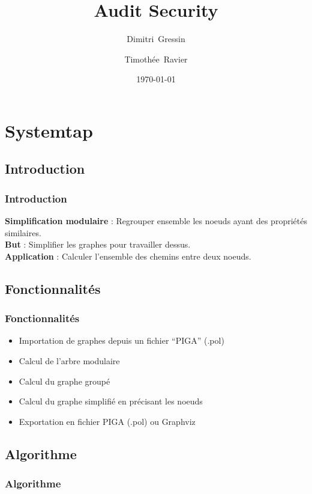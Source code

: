 \documentclass{beamer}
\title{Audit Security}
\author{Dimitri~Gressin \and Timothée~Ravier}
\institute{ENSI de Bourges}
\date{\today}
\begin{document}
{
	\framenumberoff
	\watermarkoff
	\institute{} %
	\begin{frame}
	\titlepage
	\end{frame}
}


\section{Systemtap}
\subsection{Introduction}
\begin{frame}
\frametitle{Introduction}
\textbf{Simplification modulaire} : Regrouper ensemble les noeuds ayant des propriétés similaires.\\
\textbf{But} : Simplifier les graphes pour travailler dessus.\\
\textbf{Application} : Calculer l'ensemble des chemins entre deux noeuds.\\
\end{frame}

\subsection{Fonctionnalités}
\begin{frame}
\frametitle{Fonctionnalités}
\begin{itemize}
\item Importation de graphes depuis un fichier ``PIGA'' (.pol)
\item Calcul de l'arbre modulaire
\item Calcul du graphe groupé
\item Calcul du graphe simplifié en précisant les noeuds
\item Exportation en fichier PIGA (.pol) ou Graphviz
\end{itemize}
\end{frame}

\subsection{Algorithme}
\begin{frame}
\frametitle{Algorithme}
\begin{center}
\end{center}
\end{frame}
\end{document}
